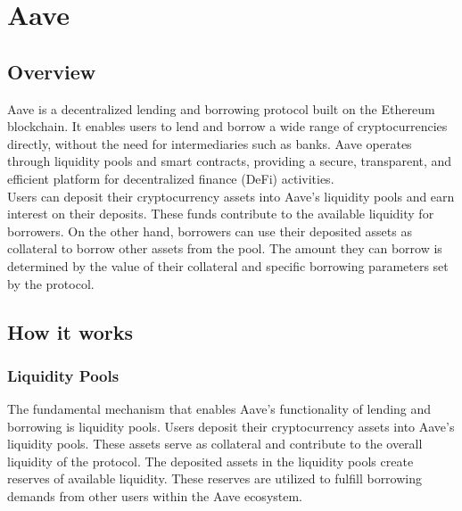 \chapter{Aave}

\section{Overview}
Aave is a decentralized lending and borrowing protocol built on the Ethereum blockchain. It enables users to lend and borrow a wide range of cryptocurrencies directly, without the need for intermediaries such as banks. Aave operates through liquidity pools and smart contracts, providing a secure, transparent, and efficient platform for decentralized finance (DeFi) activities.
\\[5mm]
Users can deposit their cryptocurrency assets into Aave's liquidity pools and earn interest on their deposits. These funds contribute to the available liquidity for borrowers. On the other hand, borrowers can use their deposited assets as collateral to borrow other assets from the pool. The amount they can borrow is determined by the value of their collateral and specific borrowing parameters set by the protocol.

\section{How it works}
\subsection{Liquidity Pools}
The fundamental mechanism that enables Aave's functionality of lending and borrowing is liquidity pools. Users deposit their cryptocurrency assets into Aave's liquidity pools. These assets serve as collateral and contribute to the overall liquidity of the protocol. The deposited assets in the liquidity pools create reserves of available liquidity. These reserves are utilized to fulfill borrowing demands from other users within the Aave ecosystem.

